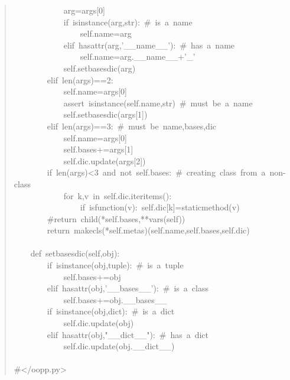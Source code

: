 \documentclass[10pt,english]{article}
\begin{document}
\begin{quote}
\begin{ttfamily}
\begin{flushleft}
\mbox{~~~~~~~~~~~~arg=args[0]}\\
\mbox{~~~~~~~~~~~~if~isinstance(arg,str):~{\#}~is~a~name~}\\
\mbox{~~~~~~~~~~~~~~~~self.name=arg}\\
\mbox{~~~~~~~~~~~~elif~hasattr(arg,'{\_}{\_}name{\_}{\_}'):~{\#}~has~a~name}\\
\mbox{~~~~~~~~~~~~~~~~self.name=arg.{\_}{\_}name{\_}{\_}+'{\_}'}\\
\mbox{~~~~~~~~~~~~self.setbasesdic(arg)}\\
\mbox{~~~~~~~~elif~len(args)==2:~}\\
\mbox{~~~~~~~~~~~~self.name=args[0]~}\\
\mbox{~~~~~~~~~~~~assert~isinstance(self.name,str)~{\#}~must~be~a~name}\\
\mbox{~~~~~~~~~~~~self.setbasesdic(args[1])}\\
\mbox{~~~~~~~~elif~len(args)==3:~{\#}~must~be~name,bases,dic}\\
\mbox{~~~~~~~~~~~~self.name=args[0]}\\
\mbox{~~~~~~~~~~~~self.bases+=args[1]}\\
\mbox{~~~~~~~~~~~~self.dic.update(args[2])}\\
\mbox{~~~~~~~~if~len(args)<3~and~not~self.bases:~{\#}~creating~class~from~a~non-class}\\
\mbox{~~~~~~~~~~~~for~k,v~in~self.dic.iteritems():}\\
\mbox{~~~~~~~~~~~~~~~~if~isfunction(v):~self.dic[k]=staticmethod(v)}\\
\mbox{~~~~~~~~{\#}return~child(*self.bases,**vars(self))}\\
\mbox{~~~~~~~~return~makecls(*self.metas)(self.name,self.bases,self.dic)}\\
\mbox{}\\
\mbox{~~~~def~setbasesdic(self,obj):}\\
\mbox{~~~~~~~~if~isinstance(obj,tuple):~{\#}~is~a~tuple}\\
\mbox{~~~~~~~~~~~~self.bases+=obj}\\
\mbox{~~~~~~~~elif~hasattr(obj,'{\_}{\_}bases{\_}{\_}'):~{\#}~is~a~class}\\
\mbox{~~~~~~~~~~~~self.bases+=obj.{\_}{\_}bases{\_}{\_}}\\
\mbox{~~~~~~~~if~isinstance(obj,dict):~{\#}~is~a~dict}\\
\mbox{~~~~~~~~~~~~self.dic.update(obj)}\\
\mbox{~~~~~~~~elif~hasattr(obj,"{\_}{\_}dict{\_}{\_}"):~{\#}~has~a~dict}\\
\mbox{~~~~~~~~~~~~self.dic.update(obj.{\_}{\_}dict{\_}{\_})}\\
\mbox{}\\
\mbox{{\#}</oopp.py>}
\end{flushleft}\end{ttfamily}
\end{quote}
\end{document}
